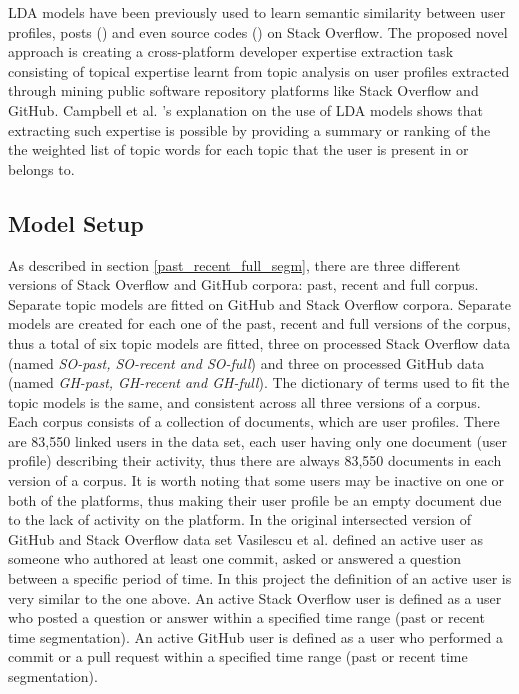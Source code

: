     LDA models have been previously used to learn semantic similarity between user profiles, posts (\cite{tian2013predicting}) and even source codes (\cite{arwan2015source}) on Stack Overflow. The proposed novel approach is creating a cross-platform developer expertise extraction task consisting of topical expertise learnt from topic analysis on user profiles extracted through mining public software repository platforms like Stack Overflow and GitHub. Campbell et al. \cite{campbell2015latent}'s explanation on the use of LDA models shows that extracting such expertise is possible by providing a summary or ranking of the the weighted list of topic words for each topic that the user is present in or belongs to. 
        
    \subsection{Model Setup \label{activeUser_Def}}
    
        As described in section \ref{past_recent_full_segm}, there are three different versions of Stack Overflow and GitHub corpora: past, recent and full corpus. Separate topic models are fitted on GitHub and Stack Overflow corpora. Separate models are created for each one of the past, recent and full versions of the corpus, thus a total of six topic models are fitted, three on processed Stack Overflow data (named \emph{SO-past, SO-recent and SO-full}) and three on processed GitHub data (named \emph{GH-past, GH-recent and GH-full}). The dictionary of terms used to fit the topic models is the same, and consistent across all three versions of a corpus. Each corpus consists of a collection of documents, which are user profiles. There are 83,550 linked users in the data set, each user having only one document (user profile) describing their activity, thus there are always 83,550 documents in each version of a corpus. It is worth noting that some users may be inactive on one or both of the platforms, thus making their user profile be an empty document due to the lack of activity on the platform. In the original intersected version of GitHub and Stack Overflow data set Vasilescu et al. \cite{vasilescu2013stackoverflow} defined an active user as someone who authored at least one commit, asked or answered a question between a specific period of time. In this project the definition of an active user is very similar to the one above. An active Stack Overflow user is defined as a user who posted a question or answer within a specified time range (past or recent time segmentation). An active GitHub user is defined as a user who performed a commit or a pull request within a specified time range (past or recent time segmentation).
    
